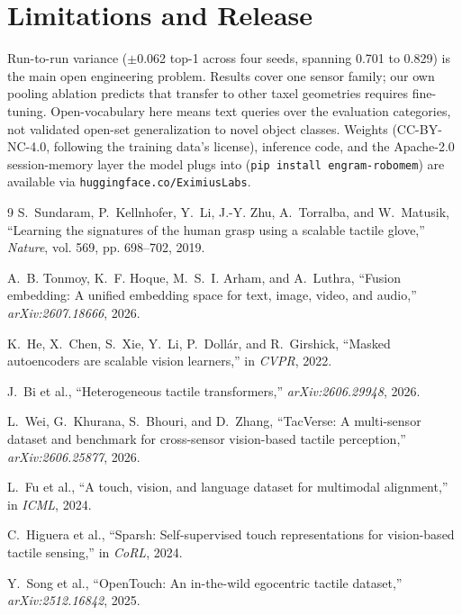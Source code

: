 \documentclass[conference]{IEEEtran}
\begin{document}
\section{Limitations and Release}
Run-to-run variance ($\pm$0.062 top-1 across four seeds, spanning 0.701 to 0.829) is the
main open engineering problem. Results cover one sensor family; our own pooling ablation
predicts that transfer to other taxel geometries requires fine-tuning. Open-vocabulary
here means text queries over the evaluation categories, not validated open-set
generalization to novel object classes. Weights (CC-BY-NC-4.0, following the training
data's license), inference code, and the Apache-2.0 session-memory layer the model plugs
into (\texttt{pip install engram-robomem}) are available via
\texttt{huggingface.co/EximiusLabs}.

\begin{thebibliography}{9}
S.~Sundaram, P.~Kellnhofer, Y.~Li, J.-Y. Zhu, A.~Torralba, and W.~Matusik,
``Learning the signatures of the human grasp using a scalable tactile glove,''
\emph{Nature}, vol. 569, pp. 698--702, 2019.

A.~B. Tonmoy, K.~F. Hoque, M.~S.~I. Arham, and A.~Luthra,
``Fusion embedding: A unified embedding space for text, image, video, and audio,''
\emph{arXiv:2607.18666}, 2026.

K.~He, X.~Chen, S.~Xie, Y.~Li, P.~Doll\'ar, and R.~Girshick,
``Masked autoencoders are scalable vision learners,'' in \emph{CVPR}, 2022.

J.~Bi et al., ``Heterogeneous tactile transformers,'' \emph{arXiv:2606.29948}, 2026.

L.~Wei, G.~Khurana, S.~Bhouri, and D.~Zhang,
``TacVerse: A multi-sensor dataset and benchmark for cross-sensor vision-based tactile
perception,'' \emph{arXiv:2606.25877}, 2026.

L.~Fu et al., ``A touch, vision, and language dataset for multimodal alignment,''
in \emph{ICML}, 2024.

C.~Higuera et al., ``Sparsh: Self-supervised touch representations for vision-based tactile
sensing,'' in \emph{CoRL}, 2024.

Y.~Song et al., ``OpenTouch: An in-the-wild egocentric tactile dataset,''
\emph{arXiv:2512.16842}, 2025.

\end{thebibliography}
\end{document}
